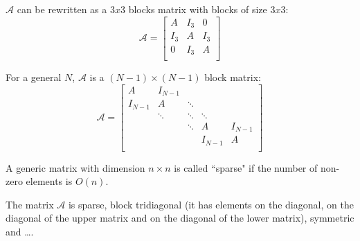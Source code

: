 $\mathcal{A}$ can be rewritten as a $3x3$ blocks matrix with blocks of size $3x3$:
\begin{equation*}
\mathcal{A} = \begin{bmatrix}
  A & I_3 &   0 \\
I_3 &   A & I_3 \\
  0 & I_3 &   A \\
\end{bmatrix}
\end{equation*}


For a general $N$, $\mathcal{A}$ is a $(N - 1) \times (N - 1)$ block matrix:
\begin{equation*}
\mathcal{A} = \begin{bmatrix}
      A & I_{N-1} &        &         &         \\
I_{N-1} &       A & \ddots &         &         \\
        &  \ddots & \ddots &  \ddots &         \\
%
        &         & \ddots &       A & I_{N-1} \\
        &         &        & I_{N-1} &       A \\
\end{bmatrix}
\end{equation*}



A generic matrix with dimension $n \times n$ is called ``sparse" if the number of non-zero elements is $O(n)$.

The matrix $\mathcal{A}$ is sparse, block tridiagonal (it has elements on the diagonal, on the diagonal of the upper matrix and on the diagonal of the lower matrix), symmetric and \dots.

\begin{equation*}
\end{equation*}


\begin{equation*}
\end{equation*}


\begin{equation*}
\end{equation*}


\begin{equation*}
\end{equation*}


\begin{equation*}
\end{equation*}


\begin{equation*}
\end{equation*}


